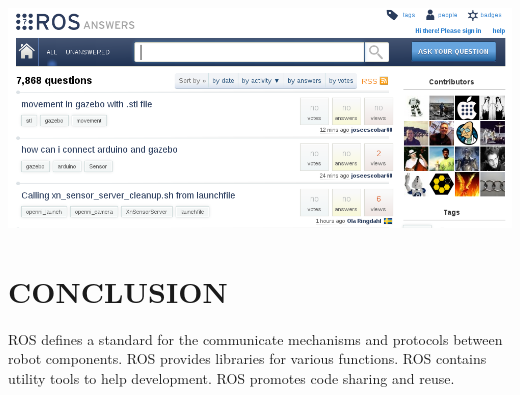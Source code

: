 \documentclass[a4paper, 10pt, conference]{ieeeconf}       %
\begin{document}
\begin{center}
  \includegraphics[width=\textwidth]{ros_answers}
\end{center}


\section{CONCLUSION}

   ROS defines a standard for the communicate mechanisms and protocols between robot components.
   ROS provides libraries for various functions.
   ROS contains utility tools to help development.
   ROS promotes code sharing and reuse.



  
\end{document}
